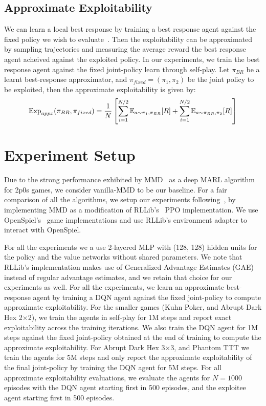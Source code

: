 \subsection{Approximate Exploitability}
We can learn a local best response by training a best response agent against the fixed policy we
wish to evaluate~\cite{timbersApproximate2022}.
Then the exploitability can be approximated by sampling trajectories and measuring the average
reward the best response agent acheived against the exploited policy.
In our experiments, we train the best response agent against the fixed joint-policy learn through
self-play.
Let $\pi_{BR}$ be a learnt best-response approximator, and $\pi_{fixed}=(\pi_1, \pi_2)$ be the
joint policy to be exploited, then the approximate exploitability is given by:
\begin{equation}
	\label{eqn:appxexp} \text{Exp}_{appx} (\pi_{BR}, \pi_{fixed}) = \frac{1}{N} \left[ \sum_{i=1}^{N/2}
		\mathbb{E}_{a \sim \pi_1, \pi_{BR}} [R] + \sum_{i=1}^{N/2} \mathbb{E}_{a \sim \pi_{BR}, \pi_2} [R] \right]
\end{equation} 

\section{Experiment Setup}
Due to the strong performance exhibited by MMD~\cite{sokotaUnified2023} as a deep MARL algorithm
for 2p0s games, we consider vanilla-MMD to be our baseline.
For a fair comparison of all the algorithms, we setup our experiments
following~\cite{sokotaUnified2023}, by implementing MMD as a modification of
RLLib's~\cite{liangRLlib2018} PPO implementation.
We use OpenSpiel's~\cite{lanctotOpenSpiel2020} game implementations and use RLLib's environment
adapter to interact with OpenSpiel.

For all the experiments we a use 2-layered MLP with (128, 128) hidden units for the policy and the
value networks without shared parameters.
We note that RLLib's implementation makes use of Generalized Advantage Estimates
(GAE)~\cite{schulmanHighDimensional2018} instead of regular advantage estimates, and we retain that
choice for our experiments as well.
For all the experiments, we learn an approximate best-response agent by training a DQN agent
against the fixed joint-policy to compute approximate exploitability.
For the smaller games (Kuhn Poker, and Abrupt Dark Hex 2$\times$2), we train the agents in
self-play for 1M steps and report exact exploitability across the training iterations.
We also train the DQN agent for 1M steps against the fixed joint-policy obtained at the end of
training to compute the approximate exploitability.
For Abrupt Dark Hex 3$\times$3, and Phantom TTT we train the agents for 5M steps and only report
the approximate exploitability of the final joint-policy by training the DQN agent for 5M steps.
For all approximate exploitability evaluations, we evaluate the agents for $N=1000$ episodes with
the DQN agent starting first in 500 episodes, and the exploitee agent starting first in 500
episodes.

